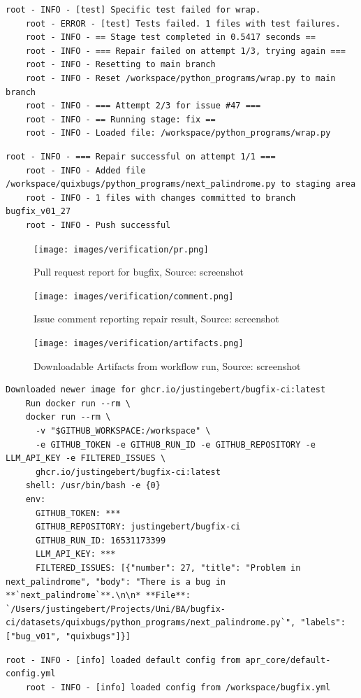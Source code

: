 \begin{lstlisting}[style=log, caption={Iterative patch generation log excerpt}, label={fig:retry}]
    root - INFO - [test] Specific test failed for wrap.
    root - ERROR - [test] Tests failed. 1 files with test failures.
    root - INFO - == Stage test completed in 0.5417 seconds ==
    root - INFO - === Repair failed on attempt 1/3, trying again ===
    root - INFO - Resetting to main branch
    root - INFO - Reset /workspace/python_programs/wrap.py to main branch
    root - INFO - === Attempt 2/3 for issue #47 ===
    root - INFO - == Running stage: fix ==
    root - INFO - Loaded file: /workspace/python_programs/wrap.py
\end{lstlisting}

\begin{lstlisting}[style=log, caption={Branch and commit created for bugfix}, label={lst:branch-commit}]
    root - INFO - === Repair successful on attempt 1/1 ===
    root - INFO - Added file /workspace/quixbugs/python_programs/next_palindrome.py to staging area
    root - INFO - 1 files with changes committed to branch bugfix_v01_27
    root - INFO - Push successful
\end{lstlisting}


\begin{figure}[H]
    \centering
    \texttt{[image: images/verification/pr.png]}
    \caption{Pull request report for bugfix, Source: screenshot}
    \label{fig:pr-report}
\end{figure}

\begin{figure}[H]
    \centering
    \texttt{[image: images/verification/comment.png]}
    \caption{Issue comment reporting repair result, Source: screenshot}
    \label{fig:comment}
\end{figure}

\begin{figure}[H]
    \centering
    \texttt{[image: images/verification/artifacts.png]}
    \caption{Downloadable Artifacts from workflow run, Source: screenshot}
    \label{fig:logs-artifacts}
\end{figure}

\begin{lstlisting}[style=log, caption={Docker container runtime log excerpt}, label={lst:docker-log}]
    Downloaded newer image for ghcr.io/justingebert/bugfix-ci:latest
    Run docker run --rm \
    docker run --rm \
      -v "$GITHUB_WORKSPACE:/workspace" \
      -e GITHUB_TOKEN -e GITHUB_RUN_ID -e GITHUB_REPOSITORY -e LLM_API_KEY -e FILTERED_ISSUES \
      ghcr.io/justingebert/bugfix-ci:latest
    shell: /usr/bin/bash -e {0}
    env:
      GITHUB_TOKEN: ***
      GITHUB_REPOSITORY: justingebert/bugfix-ci
      GITHUB_RUN_ID: 16531173399
      LLM_API_KEY: ***
      FILTERED_ISSUES: [{"number": 27, "title": "Problem in next_palindrome", "body": "There is a bug in **`next_palindrome`**.\n\n* **File**: `/Users/justingebert/Projects/Uni/BA/bugfix-ci/datasets/quixbugs/python_programs/next_palindrome.py`", "labels": ["bug_v01", "quixbugs"]}]
\end{lstlisting}

\begin{lstlisting}[style=log, caption={Load custom configuration}, label={lst:load-config}]
    root - INFO - [info] loaded default config from apr_core/default-config.yml
    root - INFO - [info] loaded config from /workspace/bugfix.yml
\end{lstlisting}